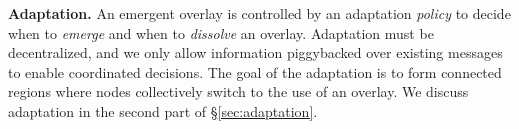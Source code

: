 \smallskip
\noindent
\textbf{Adaptation.}
%
An emergent overlay is controlled by an adaptation \emph{policy} to decide when to \emph{emerge} and when to \emph{dissolve} an overlay.
Adaptation must be decentralized, and we only allow information piggybacked over existing messages to enable coordinated decisions.
The goal of the adaptation is to form connected regions where nodes collectively switch to the use of an overlay.
We discuss adaptation in the second part of \S\ref{sec:adaptation}.



